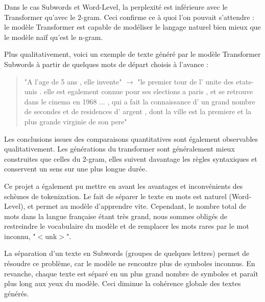 Dans le cas Subwords et Word-Level, la perplexité est inférieure avec le Transformer qu'avec le $2$-gram. Ceci confirme ce à quoi l'on pouvait s'attendre : le modèle Transformer est capable de modéliser le langage naturel bien mieux que le modèle naïf qu'est le n-gram.

Plus qualitativement, voici un exemple de texte généré par le modèle Transformer Subwords à partir de quelques mots de départ choisis à l'avance :

\begin{quotation}
"A l'age de 5 ans , elle invente" $\rightarrow$ "le premier tour de l' unite des etats-unis . elle est egalement connue pour ses elections a paris , et se retrouve dans le cinema en 1968 ... , qui a fait la connaissance d' un grand nombre de secondes et de residences d' argent , dont la ville est la premiere et la plus grande virginie de son pere" \\
\end{quotation}

Les conclusions issues des comparaisons quantitatives sont également observables qualitativement. Les générations du transformer sont généralement mieux construites que celles du $2$-gram, elles suivent davantage les règles syntaxiques et conservent un sens sur une plus longue durée.

Ce projet a également pu mettre en avant les avantages et inconvénients des schèmes de tokenization. Le fait de séparer le texte en mots est naturel (Word-Level), et permet au modèle d'apprendre vite. Cependant, le nombre total de mots dans la langue française étant très grand, nous sommes obligés de restreindre le vocabulaire du modèle et de remplacer les mots rares par le mot inconnu, "$<$unk$>$".

La séparation d'un texte en Subwords (groupes de quelques lettres) permet de résoudre ce problème, car le modèle ne rencontre plus de symboles inconnus. En revanche, chaque texte est séparé en un plus grand nombre de symboles et paraît plus long aux yeux du modèle. Ceci diminue la cohérence globale des textes générés.


